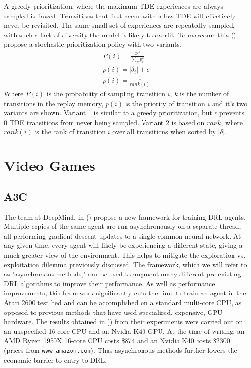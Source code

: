 A greedy prioritization, where the maximum TDE experiences are always sampled is flawed. Transitions that first occur with a low TDE will effectively never be revisited. The same small set of experiences are repeatedly sampled, with such a lack of diversity the model is likely to overfit. To overcome this (\cite{prioritized}) propose a stochastic prioritization policy with two variants.
\begin{gather}
    \label{equ:prob_exp}
    P(i) = \frac{p_i^\alpha}{\sum_kp_k^\alpha} \\
    \label{equ:priority1}
    p(i) = |\delta_i| + \epsilon \\
    \label{equ:priority2}
    p(i) = \frac{1}{rank(i)}
\end{gather}
Where $P(i)$ is the probability of sampling transition $i$, $k$ is the number of transitions in the replay memory, $p(i)$ is the priority of transition $i$ and it's two variants are shown. Variant 1 is similar to a greedy prioritization, but $\epsilon$ prevents 0 TDE transitions from never being sampled. Variant 2 is based on $rank$, where $rank(i)$ is the rank of transition $i$ over all transitions when sorted by $|\delta|$.

\section{Video Games}

\subsection{A3C}
The team at DeepMind, in (\cite{a3c}) propose a new framework for training DRL agents. Multiple copies of the same agent are run asynchronously on a separate thread, all performing gradient descent updates to a single common neural network. At any given time, every agent will likely be experiencing a different state, giving a much greater view of the environment. This helps to mitigate the exploration vs. exploitation dilemma previously discussed. The framework, which we will refer to as 'asynchronous methods,' can be used to augment many different pre-existing DRL algorithms to improve their performance. As well as performance improvements, this framework significantly cuts the time to train an agent in the Atari 2600 test bed and can be accomplished on a standard multi-core CPU, as opposed to previous methods that have used specialized, expensive, GPU hardware. The results obtained in (\cite{a3c}) from their experiments were carried out on an unspecified 16-core CPU and an Nvidia K40 GPU. At the time of writing, an AMD Ryzen 1950X 16-core CPU costs \$874 and an Nvidia K40 costs \$2300 (prices from \texttt{www.amazon.com}). Thus asynchronous methods further lowers the economic barrier to entry to DRL. \paragraph{}

